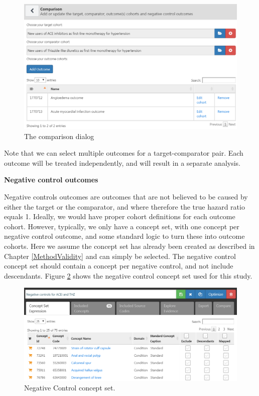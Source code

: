 \documentclass[11pt]{book}
\begin{document}
\begin{figure}

{\centering \includegraphics[width=1\linewidth]{images/PopulationLevelEstimation/comparisons} 

}

\caption{The comparison dialog}\label{fig:comparisons}
\end{figure}

Note that we can select multiple outcomes for a target-comparator pair.
Each outcome will be treated independently, and will result in a
separate analysis.

\textbf{Negative control outcomes}

Negative controls outcomes are outcomes that are not believed to be
caused by either the target or the comparator, and where therefore the
true hazard ratio equals 1. Ideally, we would have proper cohort
definitions for each outcome cohort. However, typically, we only have a
concept set, with one concept per negative control outcome, and some
standard logic to turn these into outcome cohorts. Here we assume the
concept set has already been created as described in Chapter
\ref{MethodValidity} and can simply be selected. The negative control
concept set should contain a concept per negative control, and not
include descendants. Figure \ref{fig:ncConceptSet} shows the negative
control concept set used for this study.

\begin{figure}

{\centering \includegraphics[width=1\linewidth]{images/PopulationLevelEstimation/ncConceptSet} 

}

\caption{Negative Control concept set.}\label{fig:ncConceptSet}
\end{figure}
\end{document}
